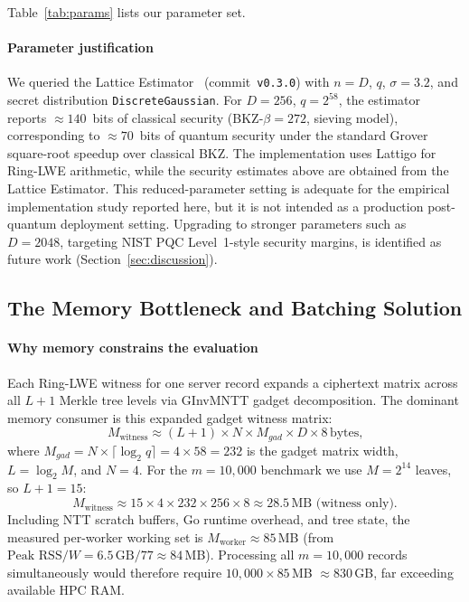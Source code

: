 \documentclass[preprint,12pt]{elsarticle}
\begin{document}
Table~\ref{tab:params} lists our parameter set.

\paragraph{Parameter justification}
We queried the Lattice Estimator~\cite{albrecht2015concrete,albrecht2021lattice}
(commit~\texttt{v0.3.0}) with $n=D$, $q$, $\sigma=3.2$, and secret
distribution \texttt{DiscreteGaussian}. For $D=256$, $q=2^{58}$, the
estimator reports $\approx 140$~bits of classical security
(BKZ-$\beta = 272$, sieving model), corresponding to $\approx 70$~bits of
quantum security under the standard Grover square-root speedup over classical
BKZ. The implementation uses Lattigo for Ring-LWE arithmetic, while the
security estimates above are obtained from the Lattice Estimator. This
reduced-parameter setting is adequate for the empirical
implementation study reported here, but it is not intended as a production
post-quantum deployment setting. Upgrading to stronger parameters such as
$D=2048$, targeting NIST PQC Level~1-style security margins, is identified
as future work (Section~\ref{sec:discussion}).

\subsection{The Memory Bottleneck and Batching Solution}

\paragraph{Why memory constrains the evaluation}
Each Ring-LWE witness for one server record expands a ciphertext matrix
across all $L+1$ Merkle tree levels via GInvMNTT gadget decomposition. The
dominant memory consumer is this expanded gadget witness matrix:
\[
  M_{\text{witness}}
    \approx (L+1) \times N \times M_{\mathit{gad}} \times D \times 8\,\text{bytes,}
\]
where $M_{\mathit{gad}} = N \times \lceil\log_2 q\rceil = 4 \times 58 = 232$
is the gadget matrix width, $L = \log_2 M$, and $N=4$.
For the $m=10{,}000$ benchmark we use $M=2^{14}$ leaves, so $L+1=15$:
\[
  M_{\text{witness}} \approx 15 \times 4 \times 232 \times 256 \times 8
    \approx 28.5\,\text{MB (witness only).}
\]
Including NTT scratch buffers, Go runtime overhead, and tree state,
the measured per-worker working set is $M_{\text{worker}} \approx 85$\,MB (from
$\text{Peak RSS} / W = 6.5\,\text{GB} / 77 \approx 84$\,MB).
Processing all $m = 10{,}000$ records simultaneously would therefore require
$10{,}000 \times 85$\,MB $\approx 830$\,GB, far exceeding available HPC RAM.
\end{document}
